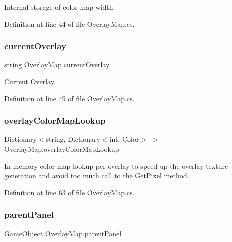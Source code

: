 Internal storage of color map width. 



Definition at line 44 of file Overlay\+Map.\+cs.

\mbox{\label{class_overlay_map_ac2b64793947ba88ca33ff3aab6c7ac21}} 
\subsubsection{\texorpdfstring{current\+Overlay}{currentOverlay}}
{\footnotesize\ttfamily string Overlay\+Map.\+current\+Overlay}



Current Overlay. 



Definition at line 49 of file Overlay\+Map.\+cs.

\mbox{\label{class_overlay_map_a99587c2f7fac62c96199e3980e9be0cb}} 
\subsubsection{\texorpdfstring{overlay\+Color\+Map\+Lookup}{overlayColorMapLookup}}
{\footnotesize\ttfamily Dictionary$<$string, Dictionary$<$int, Color$>$ $>$ Overlay\+Map.\+overlay\+Color\+Map\+Lookup}



In memory color map lookup per overlay to speed up the overlay texture generation and avoid too much call to the Get\+Pixel method. 



Definition at line 63 of file Overlay\+Map.\+cs.

\mbox{\label{class_overlay_map_a3fe567a59389478f427f4d558aec9112}} 
\subsubsection{\texorpdfstring{parent\+Panel}{parentPanel}}
{\footnotesize\ttfamily Game\+Object Overlay\+Map.\+parent\+Panel}



